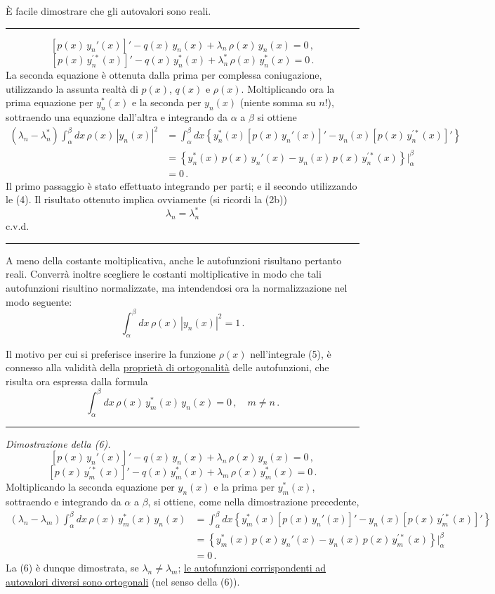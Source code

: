\documentclass[11pt, a4paper]{book}
\numberwithin{equation}{section}
\begin{document}
È facile dimostrare che gli autovalori sono reali.

\hrule
\medskip
\[
\left[p(x)\,y_n'(x)\right]' - q(x)\,y_n(x) + \lambda_n\,\rho(x)\,y_n(x) = 0\,,
\]
\[
\left[p(x)\,y_n^{\prime*}(x)\right]' - q(x)\,y_n^*(x) + \lambda_n^*\,\rho(x)\,y_n^*(x) = 0\,.
\]
La seconda equazione è ottenuta dalla prima per complessa coniugazione, utilizzando la assunta realtà di $p(x)$, $q(x)$ e $\rho(x)$. Moltiplicando ora la prima equazione per $y_n^*(x)$ e la seconda per $y_n(x)$ (niente somma su $n$!), sottraendo una equazione dall'altra e integrando da $\alpha$ a $\beta$ si ottiene
\begin{align*}
(\lambda_n-\lambda_n^*)\int_\alpha^\beta dx\,\rho(x)\,|y_n(x)|^2
&= \int_\alpha^\beta dx\left\{y_n^*(x)\left[p(x)\,y_n'(x)\right]' - y_n(x)\left[p(x)\,y_n^{\prime*}(x)\right]'\right\}\\
&= \left\{y_n^*(x)\,p(x)\,y_n'(x) - y_n(x)\,p(x)\,y_n^{\prime*}(x)\right\}\Big|_\alpha^\beta\\
&= 0\,.
\end{align*}
Il primo passaggio è stato effettuato integrando per parti; e il secondo utilizzando le (4). Il risultato ottenuto implica ovviamente (si ricordi la (2b))
\[
\lambda_n = \lambda_n^*
\]
c.v.d.
\medskip\hrule\medskip

A meno della costante moltiplicativa, anche le autofunzioni risultano pertanto reali. Converrà inoltre scegliere le costanti moltiplicative in modo che tali autofunzioni risultino normalizzate, ma intendendosi ora la normalizzazione nel modo seguente:
\begin{equation}
\int_\alpha^\beta dx\,\rho(x)\,|y_n(x)|^2 = 1\,. \tag{5}
\end{equation}

Il motivo per cui si preferisce inserire la funzione $\rho(x)$ nell'integrale (5), è connesso alla validità della \uline{proprietà di ortogonalità} delle autofunzioni, che risulta ora espressa dalla formula
\begin{equation}
\int_\alpha^\beta dx\,\rho(x)\,y_m^*(x)\,y_n(x) = 0\,,\quad m\neq n\,. \tag{6}
\end{equation}

\hrule
\medskip
\noindent\textit{Dimostrazione della (6).}
\[
\left[p(x)\,y_n'(x)\right]' - q(x)\,y_n(x) + \lambda_n\,\rho(x)\,y_n(x) = 0\,,
\]
\[
\left[p(x)\,y_m^{\prime*}(x)\right]' - q(x)\,y_m^*(x) + \lambda_m\,\rho(x)\,y_m^*(x) = 0\,.
\]
Moltiplicando la seconda equazione per $y_n(x)$ e la prima per $y_m^*(x)$, sottraendo e integrando da $\alpha$ a $\beta$, si ottiene, come nella dimostrazione precedente,
\begin{align*}
(\lambda_n-\lambda_m)\int_\alpha^\beta dx\,\rho(x)\,y_m^*(x)\,y_n(x)
&= \int_\alpha^\beta dx\left\{y_m^*(x)\left[p(x)\,y_n'(x)\right]' - y_n(x)\left[p(x)\,y_m^{\prime*}(x)\right]'\right\}\\
&= \left\{y_m^*(x)\,p(x)\,y_n'(x) - y_n(x)\,p(x)\,y_m^{\prime*}(x)\right\}\Big|_\alpha^\beta\\
&= 0\,.
\end{align*}
La (6) è dunque dimostrata, se $\lambda_n\neq\lambda_m$; \uline{le autofunzioni corrispondenti ad autovalori diversi sono ortogonali} (nel senso della (6)).
\end{document}
